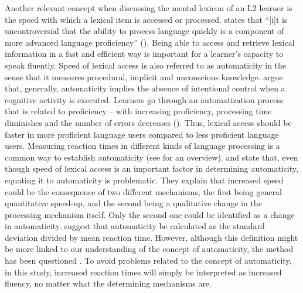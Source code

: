 \documentclass[output=paper,colorlinks,citecolor=brown,nonflat]{langsci/langscibook}
\begin{document}
Another relevant concept when discussing the mental lexicon of an L2 learner is the speed with which a lexical item is accessed or processed. \citeauthor{Pellicer-Sánchez2015} states that “[i]t is uncontroversial that the ability to process language quickly is a component of more advanced language proficiency” (\citeyear[127]{Pellicer-Sánchez2015}). Being able to access and retrieve lexical information in a fast and efficient way is important for a learner’s capacity to speak fluently. Speed of lexical access is also referred to as automaticity \citep{Schmitt2010} in the sense that it measures procedural, implicit and unconscious knowledge. \citet[371]{SegalowitzHulstijn2005} argue that, generally, automaticity implies the absence of intentional control when a cognitive activity is executed. Learners go through an automatization process that is related to proficiency – with increasing proficiency, processing time diminishes and the number of errors decreases (\citealt{DeKeyser2007}). Thus, lexical access should be faster in more proficient language users compared to less proficient language users. Measuring reaction times in different kinds of language processing is a common way to establish automaticity (see \citealt{SegalowitzHulstijn2005} for an overview). \citet{SegalowitzSegalowitz1993} and \citet{SegalowitzHulstijn2005} state that, even though speed of lexical access is an important factor in determining automaticity, equating it to automaticity is problematic. They explain that increased speed could be the consequence of two different mechanisms, the first being general quantitative speed-up, and the second being a qualitative change in the processing mechanism itself. Only the second one could be identified as a change in automaticity. \citet{SegalowitzSegalowitz1993} suggest that automaticity be calculated as the standard deviation divided by mean reaction time. However, although this definition might be more linked to our understanding of the concept of automaticity, the method has been questioned \citep{HulstijnEtAl2009}. To avoid problems related to the concept of automaticity, in this study, increased reaction times will simply be interpreted as increased fluency, no matter what the determining mechanisms are.
\end{document}

